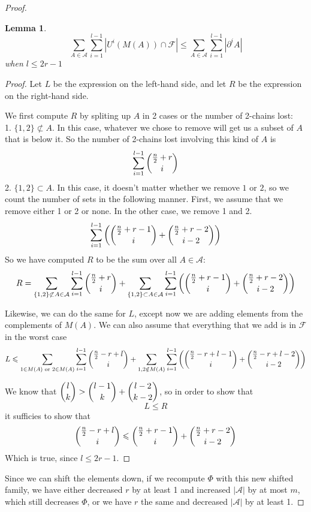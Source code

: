 \documentclass[12pt]{article}
\theoremstyle{plain}
\newtheorem{lemma}[theorem]{Lemma}
\theoremstyle{definition}
\theoremstyle{remark}
\newcommand{\F}{\mathcal{F}}
\newcommand{\A}{\mathcal{A}}
\begin{document}
\begin{proof}
\begin{lemma} 
\label{lemma1}
\[ \sum_{A\in \A}\sum_{i = 1}^{l-1} |U^i(M(A)) \cap \F| \leq \sum_{A \in \A}\sum_{i = 1}^{l-1} |\partial^i A | \]
when $l \leq 2r-1$
\end{lemma}

\begin{proof}
Let $L$ be the expression on the left-hand side, and let $R$ be the expression on the right-hand side.

We first compute $R$ by spliting up $A$ in 2 cases or the number of 2-chains lost:\\
1. $\{ 1, 2 \} \not\subset A$. In this case, whatever we chose to remove will get us a subset of $A$ that is below it. So the number of 2-chains lost involving this kind of $A$ is
\[ \sum_{i=1}^{l-1} \dbinom{\frac{n}{2} + r}{i} \]
2. $\{ 1, 2 \} \subset A$. In this case, it doesn't matter whether we remove $1$ or $2$, so we count the number of sets in the following manner. First, we assume that we remove either 1 or 2 or none. In the other case, we remove 1 and 2.
\[ \sum_{i=1}^{l-1} \left(\dbinom{\frac{n}{2} + r - 1}{i} + \dbinom{\frac{n}{2}+r-2}{i-2} \right) \]
So we have computed $R$ to be the sum over all $A \in \A$:
\[ R = \sum_{\{1, 2\} \not\subset A \in \A} \sum_{i=1}^{l-1} \dbinom{\frac{n}{2} + r}{i} + \sum_{\{1, 2\} \subset A \in \A} \sum_{i=1}^{l-1} \left( \dbinom{\frac{n}{2}+r-1}{i} + \dbinom{\frac{n}{2}+r-2}{i-2}\right) \]

Likewise, we can do the same for $L$, except now we are adding elements from the complements of $M(A)$. We can also assume that everything that we add is in $\F$ in the worst case
\[ L \leq \sum_{1 \in M(A) \text{ or } 2 \in M(A)} \sum_{i=1}^{l-1} \dbinom{\frac{n}{2}-r+l}{i} + \sum_{1, 2 \notin M(A)} \sum_{i=1}^{l-1} \left( \dbinom{\frac{n}{2}-r+l-1}{i} + \dbinom{\frac{n}{2}-r+l-2}{i-2} \right) \]

We know that $\dbinom{l}{k} > \dbinom{l-1}{k} + \dbinom{l-2}{k-2}$, so in order to show that 
\[ L \leq R \]
it sufficies to show that
\[ \dbinom{\frac{n}{2}-r+l}{i} \leq \dbinom{\frac{n}{2}+r-1}{i} + \dbinom{\frac{n}{2}+r-2}{i-2} \]
Which is true, since $l \leq 2r-1$.
\end{proof}

Since we can shift the elements down, if we recompute $\Phi$ with this new shifted family, we have either decreased $r$ by at least 1 and increased $|\A|$ by at most $m$, which still decreases $\Phi$, or we have $r$ the same and decreased $|\A|$ by at least 1. 


\end{proof}
\end{document}
